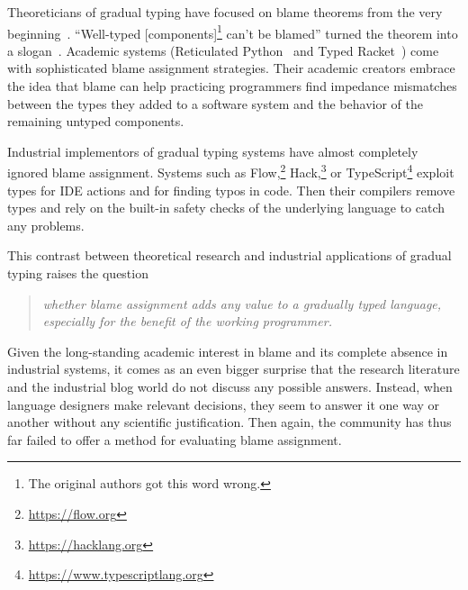
Theoreticians of gradual typing have focused on blame theorems from the very
beginning~\cite{mf-toplas-2009, tf-dls-2006}. ``Well-typed
[components]\footnote{The original authors got this word wrong.} can't be
blamed'' turned the theorem into a slogan~\cite{wf-esop-2009}. Academic systems
(Reticulated Python~\cite{vsc-dls-2019, vss-popl-2017, vksb-dls-2014} and Typed
Racket~\cite{tf-dls-2006,tf-popl-2008,tfffgksst-snapl-2017,tf-icfp-2010}) come
with sophisticated blame assignment strategies. Their academic creators embrace
the idea that blame can help practicing programmers find impedance mismatches
between the types they added to a software system and the behavior of the
remaining untyped components.

Industrial implementors of gradual typing systems have almost completely ignored
blame assignment.  Systems such as Flow,\footnote{\url{https://flow.org}}
Hack,\footnote{\url{https://hacklang.org}} or
TypeScript\footnote{\url{https://www.typescriptlang.org}} exploit types for IDE
actions and for finding typos in code. Then their compilers remove types and
rely on the built-in safety checks of the underlying language to catch any
problems.

This contrast between theoretical research and industrial applications of gradual typing raises the question 
\begin{quote}
 \it
 whether blame assignment adds any value to a gradually typed language,
 especially for the benefit of the working programmer.
\end{quote}
Given the long-standing academic interest in blame and its complete absence in
industrial systems, it comes as an even bigger surprise that the research
literature and the industrial blog world do not discuss any possible answers.
Instead, when language designers make relevant decisions, they seem to answer it
one way or another without any scientific justification. Then again, the
community has thus far failed to offer a method for evaluating blame assignment.

